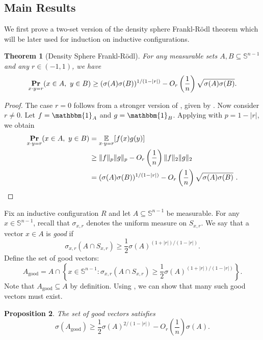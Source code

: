 \documentclass[11pt]{article}
\newtheorem{theorem}{Theorem}[section]
\newtheorem{proposition}[theorem]{Proposition}
\renewcommand{\Pr}{\mathop{\bf Pr\/}}
\newcommand{\E}{\mathop{\mathbb E\/}}
\newcommand{\indicator}{\mathbbm{1}}
\newcommand{\sn}{{\mathbb{S}^{n-1} }}
\begin{document}
\subsection{Main Results}

We first prove a two-set version of the density sphere Frankl-R\"{o}dl theorem which will be later used for induction on inductive configurations.
\begin{theorem}[Density Sphere Frankl-R\"{o}dl]
\label{thm: two set probability}
For any measurable sets \( A, B \subseteq \sn \) and any \( r \in (-1,1) \), we have
\[
\Pr_{x\cdot y = r}(x \in A,\ y \in B) \geq (\sigma(A)\sigma(B))^{1/(1 - |r|)} - O_r\left(\frac{1}{n}\right)\sqrt{\sigma(A)\sigma(B)}.
\]
\end{theorem}

\begin{proof}
The case \( r = 0 \) follows from a stronger version of , given by \cite[Theorem 5.1]{regev2011quantum}. Now consider \( r \neq 0 \). Let \( f = \indicator_A \) and \( g = \indicator_B \).
Applying  with \( p = 1 - |r| \), we obtain
\begin{align*}
\Pr_{x\cdot y = r}(x \in A,\ y \in B)
&= \E_{x \cdot y = r}[f(x)g(y)] \\
&\geq \|f\|_p \|g\|_p - O_r\left(\frac{1}{n}\right)\|f\|_2 \|g\|_2 \\
&= (\sigma(A)\sigma(B))^{1/(1 - |r|)} - O_r\left(\frac{1}{n}\right)\sqrt{\sigma(A)\sigma(B)}\ . \qedhere
\end{align*}
\end{proof}

Fix an inductive configuration \( R \) and let \( A \subseteq \sn \) be measurable. For any \( x \in \sn \), recall that \( \sigma_{x, r} \) denotes the uniform measure on \( S_{x, r} \). We say that a vector \( x \in A \) is \emph{good} if
\[
\sigma_{x, r}(A \cap S_{x, r}) \geq \frac{1}{2}\sigma(A)^{(1 + |r|)/(1 - |r|)}.
\]
Define the set of good vectors:
\[
A_{\mathrm{good}} = A \cap \left\{x \in \sn : \sigma_{x, r}(A \cap S_{x, r}) \geq \frac{1}{2}\sigma(A)^{(1 + |r|)/(1 - |r|)} \right\}.
\]
Note that $A_{\mathrm{good}} \subseteq A$ by definition. Using , we can show that many such good vectors must exist.

\begin{proposition}
\label{prop: A_good lower bound}
The set of good vectors satisfies
\[
\sigma(A_{\mathrm{good}}) \geq \frac{1}{2}\sigma(A)^{2/(1 - |r|)} - O_r\left(\frac{1}{n}\right)\sigma(A).
\]
\end{proposition}
\end{document}
